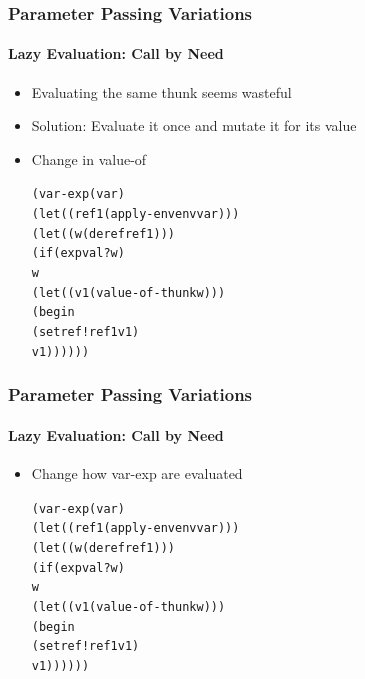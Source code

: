 \documentclass{beamer}
\begin{document}
\begin{frame}[fragile]
\frametitle{Parameter Passing Variations}
\framesubtitle{Lazy Evaluation: Call by Need}
\begin{scriptsize}
\begin{itemize}
\item<1-> Evaluating the same thunk seems wasteful

\item<2-> Solution: Evaluate it once and mutate it for its value

\item<3-> Change in value-of
\begin{alltt}
(var-exp (var)
  (let ((ref1 (apply-env env var)))
    (let ((w (deref ref1)))
      (if (expval? w)
          w	
          (let ((v1 (value-of-thunk w)))
            (begin
              (setref! ref1 v1)
              v1))))))
\end{alltt}

\end{itemize}
\end{scriptsize}
\end{frame}

\begin{frame}[fragile]
\frametitle{Parameter Passing Variations}
\framesubtitle{Lazy Evaluation: Call by Need}
\begin{scriptsize}
\begin{itemize}
\item<1-> Change how var-exp are evaluated
\begin{alltt}
(var-exp (var)
  (let ((ref1 (apply-env env var)))
    (let ((w (deref ref1)))
      (if (expval? w)
          w	
          (let ((v1 (value-of-thunk w)))
            (begin
              (setref! ref1 v1)
              v1))))))
\end{alltt}

\end{itemize}
\end{scriptsize}
\end{frame}
\end{document}
